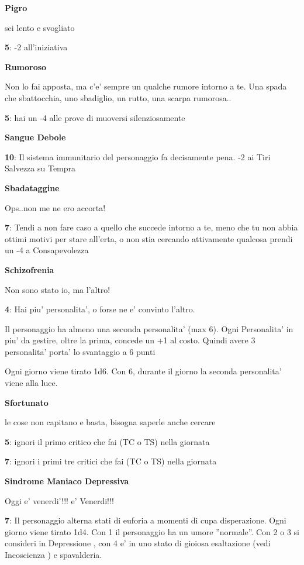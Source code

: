 \documentclass[a4paper,11pt,twoside,openany]{book}
\begin{document}
{		\textbf{Pigro}
		
		sei lento e svogliato
		
		\textbf{5}: -2 all'iniziativa
		
		\textbf{Rumoroso}
		
		Non lo fai apposta, ma c'e' sempre un qualche rumore intorno a te. Una spada che sbattocchia, uno sbadiglio, un rutto, una scarpa rumorosa..
		
		\textbf{5}: hai un -4 alle prove di muoversi silenziosamente
		
		\textbf{Sangue Debole}
		
		\textbf{10}: Il sistema immunitario del personaggio fa decisamente pena. -2 ai Tiri Salvezza su Tempra
		
		\textbf{Sbadataggine}
		
		Ops..non me ne ero accorta!
		
		\textbf{7}: Tendi a non fare caso a quello che succede intorno a te, meno che tu non abbia ottimi motivi per stare all'erta, o non stia cercando attivamente qualcosa prendi un -4 a Consapevolezza
		
		\textbf{Schizofrenia}
		
		Non sono stato io, ma l'altro!
		
		\textbf{4}: Hai piu' personalita', o forse ne e' convinto l'altro.
		
		Il personaggio ha almeno una seconda personalita' (max 6).
		Ogni Personalita' in piu' da gestire, oltre la prima, concede un +1 al costo.
		Quindi avere 3 personalita' porta' lo svantaggio a 6 punti
		
		Ogni giorno viene tirato 1d6. Con 6, durante il giorno la seconda personalita' viene alla luce.
		
		\textbf{Sfortunato}
		
		le cose non capitano e basta, bisogna saperle anche cercare
		
		\textbf{5}: ignori il primo critico che fai (TC o TS) nella giornata
		
		\textbf{7}: ignori i primi tre critici che fai (TC o TS) nella giornata
		
		\textbf{Sindrome Maniaco Depressiva}
		
		Oggi e' venerdi'!!! e' Venerdi!!!
		
		\textbf{7}: Il personaggio alterna stati di euforia a momenti di cupa disperazione. Ogni giorno viene tirato 1d4. Con 1 il personaggio ha un umore ''normale''. Con 2 o 3 si consideri in Depressione , con 4 e' in uno stato di gioiosa esaltazione (vedi Incoscienza ) e spavalderia.
		
}
\end{document}
